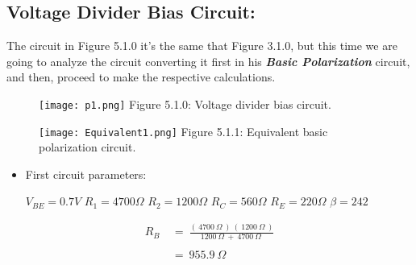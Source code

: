 \subsection{Voltage Divider Bias Circuit:}

\setcounter{equation}{0}

The circuit in Figure 5.1.0 it's the same that Figure 3.1.0, but this time we are going to analyze the circuit converting it first in his {\bfseries\itshape Basic Polarization} circuit, and then, proceed to make the respective calculations. \hfill

\begin{multicols}{2}
\begin{figure}[H]
\texttt{[image: p1.png]}
\centering \linebreak \linebreak Figure 5.1.0: Voltage divider bias circuit.
\end{figure}

\begin{figure}[H]
\texttt{[image: Equivalent1.png]}
\centering \linebreak \linebreak Figure 5.1.1: Equivalent basic polarization circuit.
\end{figure}
\end{multicols} \hfill

{\bfseries
\begin{itemize}
\item First circuit parameters:
\begin{tasks}
\task $V_{BE} =  0.7 V$
\task $R_{1} = 4700 \Omega$
\task $R_{2} = 1200 \Omega$
\task $R_{C} = 560 \Omega$
\task $R_{E} = 220 \Omega$
\task $\beta = 242 $
\end{tasks}
\end{itemize}} \hfill \break

{\bfseries\itshape{}} 

\begin{flushright}
{\bfseries\itshape{}} \hfill \break
\end{flushright}

\begin{ceqn}
\begin{align}
R_{B}\ &=\ \frac{(\ 4700\ \Omega\ )\ (\ 1200\ \Omega\ )}{1200\ \Omega\ +\ 4700\ \Omega\ } \\ \\
&=\ 955.9\ \Omega
\end{align}
\end{ceqn} \pagebreak

